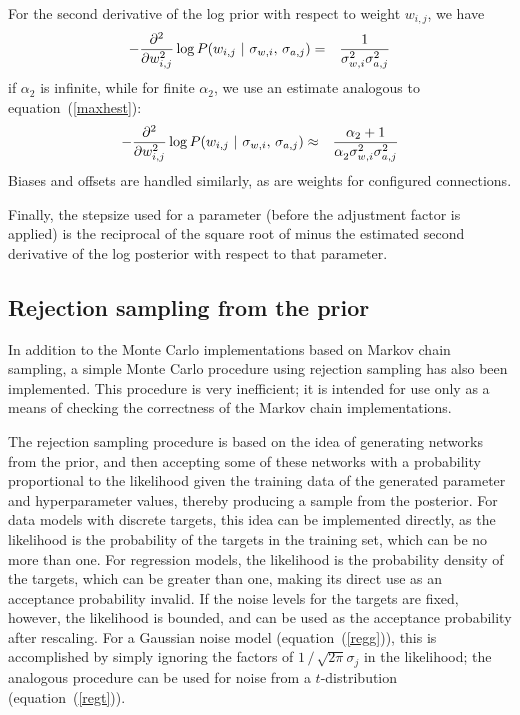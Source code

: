 \documentclass{report}[11pt]
\def\beq{\begin{eqnarray}}
\def\eeq{\end{eqnarray}}
\begin{document}
For the second derivative of the log prior with respect to weight
$w_{i,j}$, we have\beq
  - {\partial^2 \over \partial w_{i,j}^2} 
      \log P(w_{i,j}\ |\ \sigma_{w,i},\,\sigma_{a,j}) 
    & = & {1 \over \sigma_{w,i}^2\sigma_{a,j}^2}
\eeq%
if $\alpha_2$ is infinite, while for finite $\alpha_2$, we use an
estimate analogous to equation~(\ref{maxhest}):\beq
 - {\partial^2 \over \partial w_{i,j}^2} 
      \log P(w_{i,j}\ |\ \sigma_{w,i},\,\sigma_{a,j}) 
   & \approx & {\alpha_2 + 1 \over \alpha_2^{\ } \sigma_{w,i}^2 \sigma_{a,j}^2} 
\eeq%
Biases and offsets are handled similarly, as are weights for 
configured connections.

Finally, the stepsize used for a parameter (before the adjustment
factor is applied) is the reciprocal of the square root of minus the
estimated second derivative of the log posterior with respect to that
parameter.


\subsection*{Rejection sampling from the prior}\label{app-rej}

In addition to the Monte Carlo implementations based on Markov chain
sampling, a simple Monte Carlo procedure using rejection sampling has
also been implemented.  This procedure is very inefficient; it is
intended for use only as a means of checking the correctness of the
Markov chain implementations.

The rejection sampling procedure is based on the idea of generating
networks from the prior, and then accepting some of these networks
with a probability proportional to the likelihood given the training
data of the generated parameter and hyperparameter values, thereby
producing a sample from the posterior.  For data models with discrete
targets, this idea can be implemented directly, as the likelihood is
the probability of the targets in the training set, which can be no
more than one.  For regression models, the likelihood is the
probability density of the targets, which can be greater than one,
making its direct use as an acceptance probability invalid.  If the
noise levels for the targets are fixed, however, the likelihood is
bounded, and can be used as the acceptance probability after
rescaling.  For a Gaussian noise model (equation~(\ref{regg})), this
is accomplished by simply ignoring the factors of
$1\,/\,\sqrt{2\pi}\sigma_j$ in the likelihood; the analogous procedure
can be used for noise from a $t$-distribution (equation~(\ref{regt})).
\end{document}
